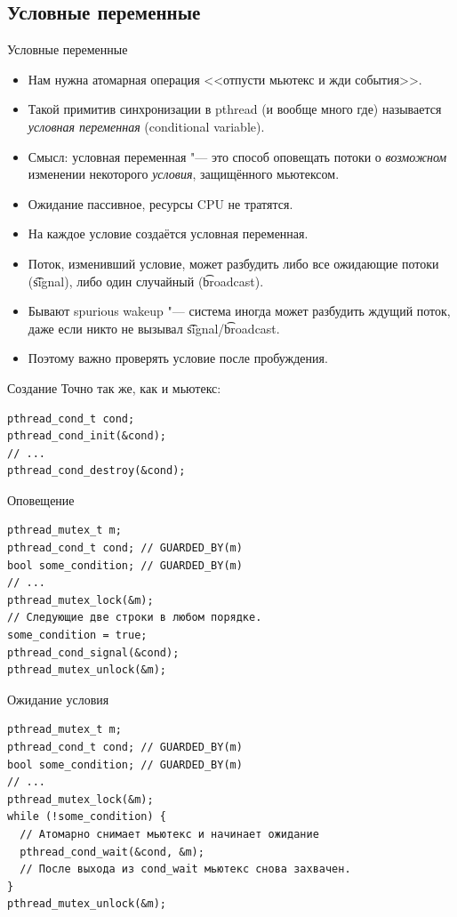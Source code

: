 \subsection{Условные переменные}

\begin{frame}{Условные переменные}
	\begin{itemize}
		\item Нам нужна атомарная операция <<отпусти мьютекс и жди события>>.
		\item Такой примитив синхронизации в pthread (и вообще много где) называется \textit{условная переменная} (conditional variable).
		\item Смысл: условная переменная "--- это способ оповещать потоки о \textit{возможном} изменении некоторого \textit{условия}, защищённого мьютексом.
		\item Ожидание пассивное, ресурсы CPU не тратятся.
		\item На каждое условие создаётся условная переменная.
		\item Поток, изменивший условие, может разбудить либо все ожидающие потоки (\t{signal}), либо один случайный (\t{broadcast}).
		\item Бывают spurious wakeup "--- система иногда может разбудить ждущий поток, даже если никто не вызывал \t{signal}/\t{broadcast}.
		\item Поэтому важно проверять условие после пробуждения.
	\end{itemize}
\end{frame}

\begin{frame}[fragile]{Создание}
	Точно так же, как и мьютекс:
\begin{verbatim}
pthread_cond_t cond;
pthread_cond_init(&cond);
// ...
pthread_cond_destroy(&cond);
\end{verbatim}
\end{frame}

\begin{frame}[fragile]{Оповещение}
\begin{verbatim}
pthread_mutex_t m;
pthread_cond_t cond; // GUARDED_BY(m)
bool some_condition; // GUARDED_BY(m)
// ...
pthread_mutex_lock(&m);
// Следующие две строки в любом порядке.
some_condition = true;
pthread_cond_signal(&cond);
pthread_mutex_unlock(&m);
\end{verbatim}
\end{frame}

\begin{frame}[fragile]{Ожидание условия}
\begin{verbatim}
pthread_mutex_t m;
pthread_cond_t cond; // GUARDED_BY(m)
bool some_condition; // GUARDED_BY(m)
// ...
pthread_mutex_lock(&m);
while (!some_condition) {
  // Атомарно снимает мьютекс и начинает ожидание
  pthread_cond_wait(&cond, &m);
  // После выхода из cond_wait мьютекс снова захвачен.
}
pthread_mutex_unlock(&m);
\end{verbatim}
\end{frame}
